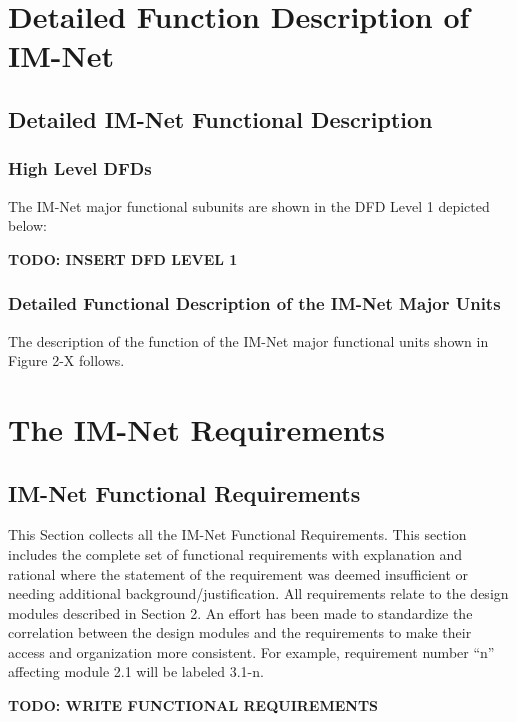 \documentclass[letterpaper]{article}
\begin{document}
\eject

\section{Detailed Function Description of IM-Net}

\subsection{Detailed IM-Net Functional Description}

\subsubsection{High Level DFDs}

The IM-Net major functional subunits are shown in the DFD Level 1 depicted below:

\textbf{TODO: INSERT DFD LEVEL 1}

 
\subsubsection{Detailed Functional Description of the IM-Net Major Units}

The description of the function of the IM-Net major functional units shown in Figure 2-X follows.

\eject

\section{The IM-Net Requirements}
 
\subsection{IM-Net Functional Requirements}

This Section collects all the IM-Net Functional Requirements. This section includes the complete set of functional requirements with explanation and rational where the statement of the requirement was deemed insufficient or needing additional background/justification. All requirements relate to the design modules described in Section 2. An effort has been made to standardize the correlation between the design modules and the requirements to make their access and organization more consistent. For example, requirement number ``n'' affecting module 2.1 will be labeled 3.1-n.

\textbf{TODO: WRITE FUNCTIONAL REQUIREMENTS}\\
\end{document}
